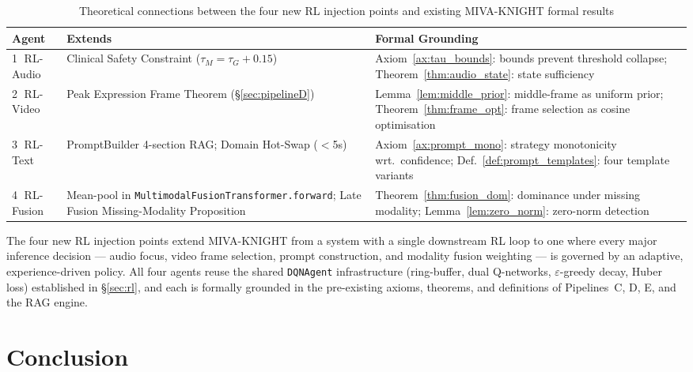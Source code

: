 \documentclass[12pt,a4paper]{article}
\theoremstyle{definition}
\theoremstyle{plain}
\theoremstyle{remark}
\begin{document}
\begin{table}[H]
\centering
\caption{Theoretical connections between the four new RL injection points and
existing MIVA-KNIGHT formal results}
\label{tab:rl_theory}
\begin{tabularx}{\textwidth}{lXX}
\toprule
\textbf{Agent} & \textbf{Extends} & \textbf{Formal Grounding} \\
\midrule
\textcircled{1} RL-Audio &
  Clinical Safety Constraint ($\tau_M = \tau_G + 0.15$) &
  Axiom~\ref{ax:tau_bounds}: bounds prevent threshold collapse;
  Theorem~\ref{thm:audio_state}: state sufficiency \\
\textcircled{2} RL-Video &
  Peak Expression Frame Theorem (\S\ref{sec:pipelineD}) &
  Lemma~\ref{lem:middle_prior}: middle-frame as uniform prior;
  Theorem~\ref{thm:frame_opt}: frame selection as cosine optimisation \\
\textcircled{3} RL-Text &
  PromptBuilder 4-section RAG; Domain Hot-Swap ($<$5s) &
  Axiom~\ref{ax:prompt_mono}: strategy monotonicity wrt.\ confidence;
  Def.~\ref{def:prompt_templates}: four template variants \\
\textcircled{4} RL-Fusion &
  Mean-pool in \texttt{MultimodalFusionTransformer.forward};
  Late Fusion Missing-Modality Proposition &
  Theorem~\ref{thm:fusion_dom}: dominance under missing modality;
  Lemma~\ref{lem:zero_norm}: zero-norm detection \\
\bottomrule
\end{tabularx}
\end{table}

\begin{tcolorbox}[keybox,title={Updated Conclusion Item 8 --- Four Modality-Wide RL Policies}]
The four new RL injection points extend MIVA-KNIGHT from a system with a
single downstream RL loop to one where every major inference decision ---
audio focus, video frame selection, prompt construction, and modality
fusion weighting --- is governed by an adaptive, experience-driven policy.
All four agents reuse the shared \texttt{DQNAgent} infrastructure (ring-buffer,
dual Q-networks, $\varepsilon$-greedy decay, Huber loss) established in
\S\ref{sec:rl}, and each is formally grounded in the pre-existing
axioms, theorems, and definitions of Pipelines~C, D, E, and the RAG engine.
\end{tcolorbox}


\newpage
\section{Conclusion}
\label{sec:conclusion}
\end{document}
